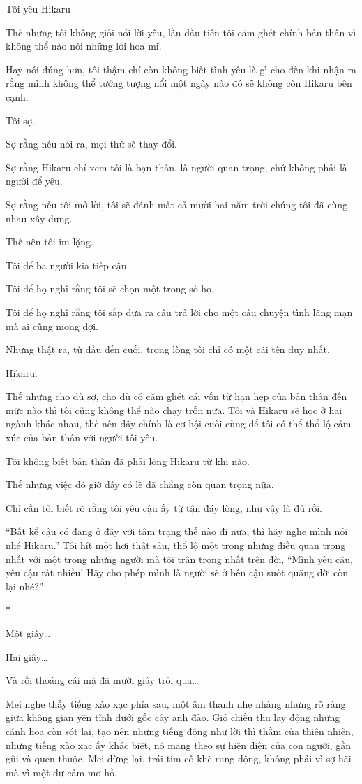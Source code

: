 {Tôi yêu Hikaru

Thế nhưng tôi không giỏi nói lời yêu, lần đầu tiên tôi căm ghét chính
bản thân vì không thể nào nói những lời hoa mĩ.

Hay nói đúng hơn, tôi thậm chí còn không biết tình yêu là gì cho đến khi
nhận ra rằng mình không thể tưởng tượng nổi một ngày nào đó sẽ không còn
Hikaru bên cạnh.

Tôi sợ.

Sợ rằng nếu nói ra, mọi thứ sẽ thay đổi.

Sợ rằng Hikaru chỉ xem tôi là bạn thân, là người quan trọng, chứ không
phải là người để yêu.

Sợ rằng nếu tôi mở lời, tôi sẽ đánh mất cả mười hai năm trời chúng tôi
đã cùng nhau xây dựng.

Thế nên tôi im lặng.

Tôi để ba người kia tiếp cận.

Tôi để họ nghĩ rằng tôi sẽ chọn một trong số họ.

Tôi để họ nghĩ rằng tôi sắp đưa ra câu trả lời cho một câu chuyện tình
lãng mạn mà ai cũng mong đợi.

Nhưng thật ra, từ đầu đến cuối, trong lòng tôi chỉ có một cái tên duy
nhất.

Hikaru.

Thế nhưng cho dù sợ, cho dù có căm ghét cái vốn từ hạn hẹp của bản thân
đến mức nào thì tôi cũng không thể nào chạy trốn nữa. Tôi và Hikaru sẽ
học ở hai ngành khác nhau, thế nên đây chính là cơ hội cuối cùng để tôi
có thể thổ lộ cảm xúc của bản thân với người tôi yêu.

Tôi không biết bản thân đã phải lòng Hikaru từ khi nào.

Thế nhưng việc đó giờ đây có lẽ đã chẳng còn quan trọng nữa.

Chỉ cần tôi biết rõ rằng tôi yêu cậu ấy từ tận đáy lòng, như vậy là đủ
rồi.

``Bất kể cậu có đang ở đây với tâm trạng thế nào đi nữa, thì hãy nghe
mình nói nhé Hikaru.'' Tôi hít một hơi thật sâu, thổ lộ một trong những
điều quan trọng nhất với một trong những người mà tôi trân trọng nhất
trên đời, ``Mình yêu cậu, yêu cậu rất nhiều! Hãy cho phép mình là người
sẽ ở bên cậu suốt quãng đời còn lại nhé?''

*

Một giây\ldots{}

Hai giây\ldots{}

Và rồi thoáng cái mà đã mười giây trôi qua\ldots{}

Mei nghe thấy tiếng xào xạc phía sau, một âm thanh nhẹ nhàng nhưng rõ
ràng giữa không gian yên tĩnh dưới gốc cây anh đào. Gió chiều thu lay
động những cánh hoa còn sót lại, tạo nên những tiếng động như lời thì
thầm của thiên nhiên, nhưng tiếng xào xạc ấy khác biệt, nó mang theo sự
hiện diện của con người, gần gũi và quen thuộc. Mei dừng lại, trái tim
cô khẽ rung động, không phải vì sợ hãi mà vì một dự cảm mơ hồ.

}
